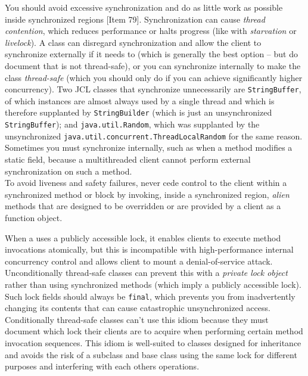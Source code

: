 \documentclass[8pt, table, xcdraw]{article}%
\begin{document}
You should avoid excessive synchronization and do as little work as possible inside synchronized regions [Item 79]. Synchronization can cause \emph{thread contention}, which reduces performance or halts progress (like with \emph{starvation} or \emph{livelock}). A class can disregard synchronization and allow the client to synchronize externally if it needs to (which is generally the best option -- but do document that is not thread-safe), or you can synchronize internally to make the class \emph{thread-safe} (which you should only do if you can achieve significantly higher concurrency). Two JCL classes that synchronize unnecessarily are \lstinline{StringBuffer}, of which instances are almost always used by a single thread and which is therefore supplanted by \lstinline{StringBuilder} (which is just an unsynchronized \lstinline{StringBuffer}); and \lstinline{java.util.Random}, which was supplanted by the unsynchronized \lstinline{java.util.concurrent.ThreadLocalRandom} for the same reason. Sometimes you must synchronize internally, such as when a method modifies a static field, because a multithreaded client cannot perform external synchronization on such a method.\\
To avoid liveness and safety failures, never cede control to the client within a synchronized method or block by invoking, inside a synchronized region, \emph{alien} methods that are designed to be overridden or are provided by a client as a function object.

When a uses a publicly accessible lock, it enables clients to execute method invocations atomically, but this is incompatible with high-performance internal concurrency control and allows client to mount a denial-of-service attack. Unconditionally thread-safe
classes can prevent this with a \emph{private lock object} rather than using synchronized methods (which imply a publicly accessible lock). Such lock fields should always be \lstinline{final}, which prevents you from inadvertently changing its contents that can cause catastrophic unsynchronized access. Conditionally thread-safe classes can’t use this idiom because they must document which lock their clients are to acquire when performing certain method invocation sequences. This idiom is well-suited to classes designed for inheritance and avoids the risk of a subclass and base class using the same lock for different purposes and interfering with each others operations.
\end{document}
